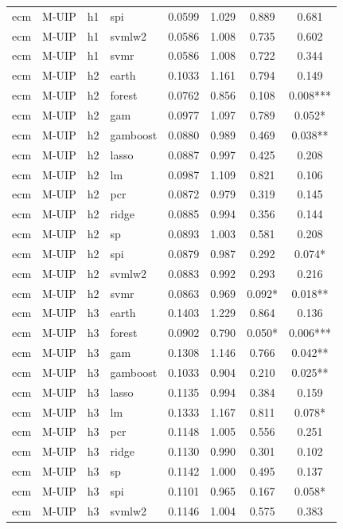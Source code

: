 \begin{ThreePartTable}
\begin{longtable}[t]{llclcccc}
ecm & M-UIP & h1 & spi & 0.0599 & 1.029 & 0.889 & 0.681\\
ecm & M-UIP & h1 & svmlw2 & 0.0586 & 1.008 & 0.735 & 0.602\\
ecm & M-UIP & h1 & svmr & 0.0586 & 1.008 & 0.722 & 0.344\\
\addlinespace
ecm & M-UIP & h2 & earth & 0.1033 & 1.161 & 0.794 & 0.149\\
ecm & M-UIP & h2 & forest & 0.0762 & 0.856 & 0.108 & 0.008***\\
ecm & M-UIP & h2 & gam & 0.0977 & 1.097 & 0.789 & 0.052*\\
ecm & M-UIP & h2 & gamboost & 0.0880 & 0.989 & 0.469 & 0.038**\\
ecm & M-UIP & h2 & lasso & 0.0887 & 0.997 & 0.425 & 0.208\\
ecm & M-UIP & h2 & lm & 0.0987 & 1.109 & 0.821 & 0.106\\
ecm & M-UIP & h2 & pcr & 0.0872 & 0.979 & 0.319 & 0.145\\
ecm & M-UIP & h2 & ridge & 0.0885 & 0.994 & 0.356 & 0.144\\
ecm & M-UIP & h2 & sp & 0.0893 & 1.003 & 0.581 & 0.208\\
ecm & M-UIP & h2 & spi & 0.0879 & 0.987 & 0.292 & 0.074*\\
ecm & M-UIP & h2 & svmlw2 & 0.0883 & 0.992 & 0.293 & 0.216\\
ecm & M-UIP & h2 & svmr & 0.0863 & 0.969 & 0.092* & 0.018**\\
\addlinespace
ecm & M-UIP & h3 & earth & 0.1403 & 1.229 & 0.864 & 0.136\\
ecm & M-UIP & h3 & forest & 0.0902 & 0.790 & 0.050* & 0.006***\\
ecm & M-UIP & h3 & gam & 0.1308 & 1.146 & 0.766 & 0.042**\\
ecm & M-UIP & h3 & gamboost & 0.1033 & 0.904 & 0.210 & 0.025**\\
ecm & M-UIP & h3 & lasso & 0.1135 & 0.994 & 0.384 & 0.159\\
ecm & M-UIP & h3 & lm & 0.1333 & 1.167 & 0.811 & 0.078*\\
ecm & M-UIP & h3 & pcr & 0.1148 & 1.005 & 0.556 & 0.251\\
ecm & M-UIP & h3 & ridge & 0.1130 & 0.990 & 0.301 & 0.102\\
ecm & M-UIP & h3 & sp & 0.1142 & 1.000 & 0.495 & 0.137\\
ecm & M-UIP & h3 & spi & 0.1101 & 0.965 & 0.167 & 0.058*\\
ecm & M-UIP & h3 & svmlw2 & 0.1146 & 1.004 & 0.575 & 0.383\\

\end{longtable}
\end{ThreePartTable}
